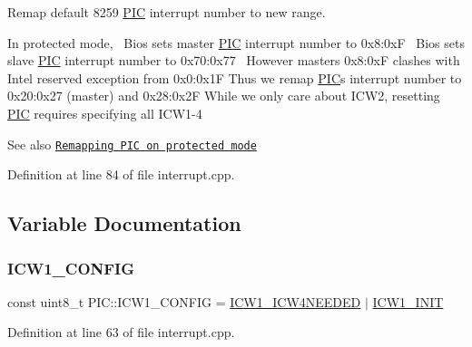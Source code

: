Remap default 8259 \hyperlink{namespace_p_i_c}{P\+IC} interrupt number to new range. 

In protected mode,~\newline
Bios sets master \hyperlink{namespace_p_i_c}{P\+IC} interrupt number to 0x8\+:0xF~\newline
Bios sets slave \hyperlink{namespace_p_i_c}{P\+IC} interrupt number to 0x70\+:0x77~\newline
However master\textquotesingle{}s 0x8\+:0xF clashes with Intel reserved exception from 0x0\+:0x1F Thus we remap \hyperlink{namespace_p_i_c}{P\+IC}\textquotesingle{}s interrupt number to 0x20\+:0x27 (master) and 0x28\+:0x2F While we only care about I\+C\+W2, resetting \hyperlink{namespace_p_i_c}{P\+IC} requires specifying all I\+C\+W1-\/4 \begin{DoxySeeAlso}{See also}
\href{https://wiki.osdev.org/8259_PIC#Protected_Mode}{\tt Remapping P\+IC on protected mode} 
\end{DoxySeeAlso}


Definition at line 84 of file interrupt.\+cpp.



\subsection{Variable Documentation}
\mbox{\label{namespace_p_i_c_aa3b99beaed95a8a51f1e855723e05d48}} 
\subsubsection{\texorpdfstring{I\+C\+W1\+\_\+\+C\+O\+N\+F\+IG}{ICW1\_CONFIG}}
{\footnotesize\ttfamily const uint8\+\_\+t P\+I\+C\+::\+I\+C\+W1\+\_\+\+C\+O\+N\+F\+IG = \hyperlink{namespace_p_i_c_a63beb0c60fdab8c997f42291a7c2baf5}{I\+C\+W1\+\_\+\+I\+C\+W4\+N\+E\+E\+D\+ED} $\vert$ \hyperlink{namespace_p_i_c_a8bb2fc0a772eabbbf6adb002f578290e}{I\+C\+W1\+\_\+\+I\+N\+IT}}



Definition at line 63 of file interrupt.\+cpp.

\mbox{\label{namespace_p_i_c_a63beb0c60fdab8c997f42291a7c2baf5}} 
